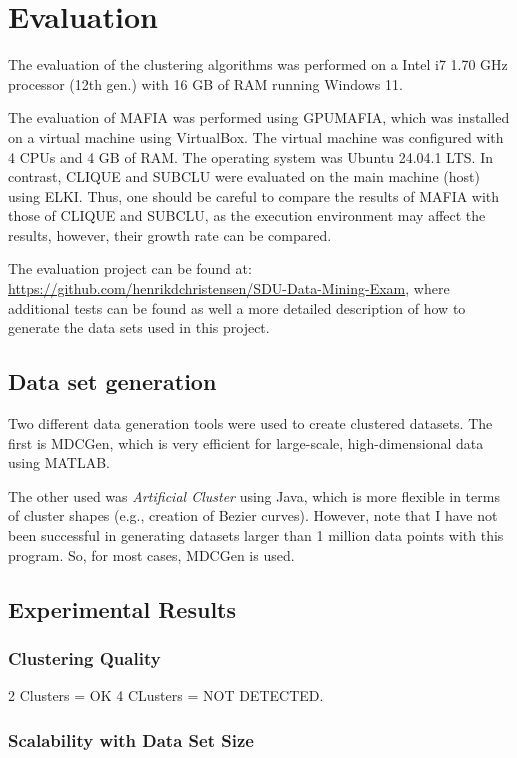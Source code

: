 \section{Evaluation}
The evaluation of the clustering algorithms was performed on a Intel i7 1.70 GHz processor (12th gen.) with 16 GB of RAM running Windows 11.

The evaluation of MAFIA was performed using GPUMAFIA, which was installed on a virtual machine using VirtualBox. The virtual machine was configured with 4 CPUs and 4 GB of RAM. The operating system was Ubuntu 24.04.1 LTS. In contrast, CLIQUE and SUBCLU were evaluated on the main machine (host) using ELKI. Thus, one should be careful to compare the results of MAFIA with those of CLIQUE and SUBCLU, as the execution environment may affect the results, however, their growth rate can be compared.

The evaluation project can be found at: \url{https://github.com/henrikdchristensen/SDU-Data-Mining-Exam}, where additional tests can be found as well a more detailed description of how to generate the data sets used in this project.

\subsection{Data set generation}
Two different data generation tools were used to create clustered datasets. The first is MDCGen, which is very efficient for large-scale, high-dimensional data using MATLAB.

The other used was \textit{Artificial Cluster} using Java, which is more flexible in terms of cluster shapes (e.g., creation of Bezier curves). However, note that I have not been successful in generating datasets larger than 1 million data points with this program. So, for most cases, MDCGen is used.

\subsection{Experimental Results}
\subsubsection{Clustering Quality}
2 Clusters = OK
4 CLusters = NOT DETECTED.

\subsubsection{Scalability with Data Set Size}
